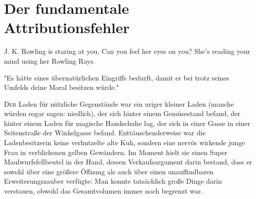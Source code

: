 \chapter{Der fundamentale Attributionsfehler}

\begin{chapterOpeningAuthorNote}
J. K. Rowling is staring at you. Can you feel her eyes on you? She's reading your mind using her Rowling Rays.
\end{chapterOpeningAuthorNote}

\begin{chapterOpeningQuote}
"Es hätte eines übernatürlichen Eingriffs bedurft, damit er bei trotz seines Umfelds deine Moral besitzen würde." 
\end{chapterOpeningQuote}


\lettrine{D}{er} Laden für nützliche Gegenstände war ein uriger kleiner Laden (manche würden sogar sagen: niedlich), der sich hinter einem Gemüsestand befand, der hinter einem Laden für magische Handschuhe lag, der sich in einer Gasse in einer Seitenstraße der Winkelgasse befand. Enttäuschenderweise war die Ladenbesitzerin keine verhutzelte alte Kuh, sondern eine nervös wirkende junge Frau in verblichenen gelben Gewändern. Im Moment hielt sie einen Super Maulwurfsfellbeutel  in der Hand, dessen Verkaufsargument darin bestand, dass er sowohl über eine größere Öffnung als auch über einen unauffindbaren Erweiterungszauber verfügte: Man konnte tatsächlich große Dinge darin verstauen, obwohl das Gesamtvolumen immer noch begrenzt war.

